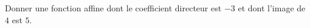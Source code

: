 
\begin{exercice}\label{exosmath-0645}

    Donner une fonction affine dont le coefficient directeur est \( -3\) et dont l'image de \( 4\) est \( 5\).

\end{exercice}
